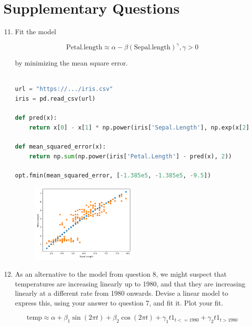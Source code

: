 \documentclass[10pt,\jkfside,a4paper]{article}
\begin{document}
\section{Supplementary Questions}

\begin{enumerate}[label=\arabic*]

\setcounter{enumi}{10}

\item Fit the model

\[
\text{Petal.length} \approx \alpha - \beta(\text{Sepal.length})^{\gamma},
\gamma > 0
\]

by minimizing the mean square error.

\begin{lstlisting}[language=Python]

url = "https://.../iris.csv"
iris = pd.read_csv(url)

def pred(x):
	return x[0] - x[1] * np.power(iris['Sepal.Length'], np.exp(x[2]))

def mean_squared_error(x):
	return np.sum(np.power(iris['Petal.Length'] - pred(x), 2))

opt.fmin(mean_squared_error, [-1.385e5, -1.385e5, -9.5])

\end{lstlisting}

\begin{figure}[H]
\centering
\includegraphics[width=0.5\textwidth]{./q7_sepaltopetal}
\end{figure}

\item As an alternative to the model from question 8, we might suspect that
temperatures are increasing linearly up to 1980, and that they are
increasing linearly at a different rate from 1980 onwards. Devise a linear
model to express this, using your answer to question 7, and fit it. Plot
your fit.

\[
\text{temp} \approx \alpha + \beta_1\sin(2\pi t) + \beta_2\cos(2\pi t) +
\gamma_1 t 1_{t<=1980} + \gamma_2 t 1_{t > 1980}
\]


\end{enumerate}
\end{document}
